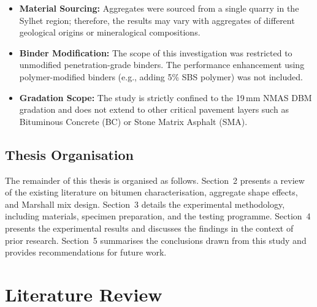 \documentclass[12pt,a4paper]{article}
\begin{document}
\begin{itemize}
    A more comprehensive metric incorporating the aforementioned Shape factor or Sphericity, or the Particle Index (PI), was not determined. Evaluating the Particle Index (PI) would have provided a more adequate measure of the combined contributions of particle shape, angularity, and surface texture to the dense packing configuration and internal resistance of the mix.
    \item \textbf{Material Sourcing:} Aggregates were sourced from a single quarry in the Sylhet region; therefore, the results may vary with aggregates of different geological origins or mineralogical compositions.
    \item \textbf{Binder Modification:} The scope of this investigation was restricted to unmodified penetration-grade binders. The performance enhancement using polymer-modified binders (e.g., adding 5\% SBS polymer) was not included.
    \item \textbf{Gradation Scope:} The study is strictly confined to the 19\,mm NMAS DBM gradation and does not extend to other critical pavement layers such as Bituminous Concrete (BC) or Stone Matrix Asphalt (SMA).
\end{itemize}

\subsection{Thesis Organisation}

The remainder of this thesis is organised as follows. Section~2 presents a review of the existing literature on bitumen characterisation, aggregate shape effects, and Marshall mix design. Section~3 details the experimental methodology, including materials, specimen preparation, and the testing programme. Section~4 presents the experimental results and discusses the findings in the context of prior research. Section~5 summarises the conclusions drawn from this study and provides recommendations for future work.



\section{Literature Review}
\end{document}
